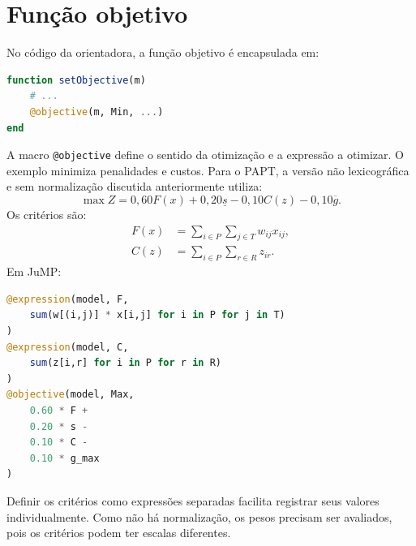 \documentclass[11pt,a4paper]{article}
\begin{document}
\section{Função objetivo}
No código da orientadora, a função objetivo é encapsulada em:
\begin{lstlisting}[language=Julia]
function setObjective(m)
    # ...
    @objective(m, Min, ...)
end
\end{lstlisting}
A macro \texttt{@objective} define o sentido da otimização e a expressão a otimizar. O exemplo minimiza penalidades e custos. Para o PAPT, a versão não lexicográfica e sem normalização discutida anteriormente utiliza:
\begin{equation}
\max Z =
0{,}60F(x)+0{,}20\underline{s}
-0{,}10C(z)-0{,}10\overline{g}.
\end{equation}
Os critérios são:
\begin{align}
F(x) &= \sum_{i\in P}\sum_{j\in T} w_{ij}x_{ij},\\
C(z) &= \sum_{i\in P}\sum_{r\in R}z_{ir}.
\end{align}
Em JuMP:
\begin{lstlisting}[language=Julia]
@expression(model, F,
    sum(w[(i,j)] * x[i,j] for i in P for j in T)
)
@expression(model, C,
    sum(z[i,r] for i in P for r in R)
)
@objective(model, Max,
    0.60 * F +
    0.20 * s -
    0.10 * C -
    0.10 * g_max
)
\end{lstlisting}
Definir os critérios como expressões separadas facilita registrar seus valores individualmente. Como não há normalização, os pesos precisam ser avaliados, pois os critérios podem ter escalas diferentes.
\end{document}
